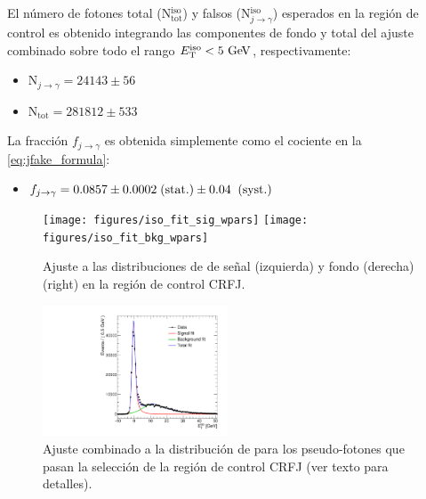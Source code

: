 
El número de fotones total (N$_\text{tot}^\text{iso}$) y falsos
(N$_{j\to\gamma}^\text{iso}$) esperados en la región de control es obtenido
integrando las componentes de fondo y total del ajuste combinado sobre todo el
rango $\etiso<5\gev$, respectivamente:

\begin{itemize}
\item[] N$_{j\to\gamma}= 24143 \pm 56$

\item[] N$_\text{tot}= 281812 \pm 533$
\end{itemize}

La fracción $f_{j\to \gamma}$ es obtenida simplemente como el cociente
en la \cref{eq:jfake_formula}:

\begin{itemize}
\item[] $f_{j\rightarrow\gamma} = 0.0857 \pm 0.0002 \mbox{$\;$(stat.)} \pm 0.04 \;\mbox{$\;$(syst.)}$
\end{itemize}

\begin{figure}[h]
  \begin{center}
  \texttt{[image: figures/iso\_fit\_sig\_wpars]}  \hfill
  \texttt{[image: figures/iso\_fit\_bkg\_wpars]}
  \caption{Ajuste a las distribuciones de {\etiso} de señal
    (izquierda) y fondo (derecha) (right) en la región
    de control CRFJ.}
  \label{fig:jetfake_sigbkg}
  \end{center}
\end{figure}

\begin{figure}[h]
  \begin{center}
  \includegraphics[width=0.49\textwidth]{figures/iso_fit_sarange}
  \caption{Ajuste combinado a la distribución de {\etiso}
    para los pseudo-fotones que pasan la selección de la región
    de control CRFJ (ver texto para detalles).}
  \label{fig:jetfake_combfit}
  \end{center}
\end{figure}

